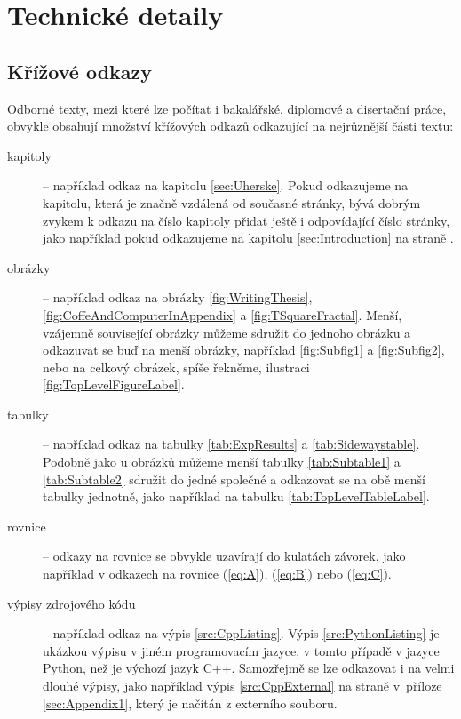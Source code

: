 \chapter{Technické detaily}
\section{Křížové odkazy}
\label{sec:CrossReferences}
Odborné texty, mezi které lze počítat i bakalářské, diplomové a disertační práce, obvykle obsahují množství křížových odkazů odkazující na nejrůznější části textu:
\begin{description}
	\item [kapitoly] -- například odkaz na kapitolu \ref{sec:Uherske}. Pokud odkazujeme na kapitolu, která je značně vzdálená od současné stránky, bývá dobrým zvykem k odkazu na číslo kapitoly přidat ještě i odpovídající číslo stránky, jako například pokud odkazujeme na kapitolu \ref{sec:Introduction} na straně \pageref{sec:Introduction}.
	
	\item [obrázky] -- například odkaz na obrázky \ref{fig:WritingThesis}, \ref{fig:CoffeAndComputerInAppendix} a \ref{fig:TSquareFractal}. Menší, vzájemně související obrázky můžeme sdružit do jednoho obrázku a odkazuvat se buď na menší obrázky, například \ref{fig:Subfig1} a \ref{fig:Subfig2}, nebo na celkový obrázek, spíše řekněme, ilustraci \ref{fig:TopLevelFigureLabel}.
	
	\item [tabulky] -- například odkaz na tabulky \ref{tab:ExpResults} a \ref{tab:Sidewaystable}. Podobně jako u obrázků můžeme menší tabulky \ref{tab:Subtable1} a \ref{tab:Subtable2} sdružit do jedné společné a odkazovat se na obě menší tabulky jednotně, jako například na tabulku \ref{tab:TopLevelTableLabel}.
	
	\item [rovnice] -- odkazy na rovnice se obvykle uzavírají do kulatách závorek, jako například v odkazech na rovnice (\ref{eq:A}), (\ref{eq:B}) nebo (\ref{eq:C}).
	
	\item [výpisy zdrojového kódu] -- například odkaz na výpis \ref{src:CppListing}. Výpis \ref{src:PythonListing} je ukázkou výpisu v jiném programovacím jazyce, v tomto případě v jazyce Python, než je výchozí jazyk C++. Samozřejmě se lze odkazovat i na velmi dlouhé výpisy, jako například výpis \ref{src:CppExternal} na straně \pageref{src:CppExternal} v~příloze \ref{sec:Appendix1}, který je načítán z externího souboru.
\end{description}

